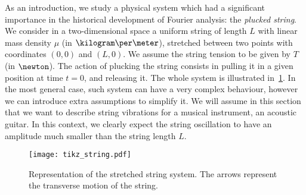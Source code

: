 As an introduction, we study a physical system which had a significant importance in the
historical development of Fourier analysis: the \emph{plucked string}. We consider in a
two-dimensional space a uniform string of length $L$ with linear mass density $\mu$ (in
$\kilogram\per\meter$), stretched between two points with coordinates $(0,0)$ and $(L,0)$.
We assume the string tension to be given by $T$ (in $\newton$). The action of plucking the
string consists in pulling it in a given position at time $t=0$, and releasing it. The
whole system is illustrated in~\cref{fig:string}. In the most general case, such system
can have a very complex behaviour, however we can introduce extra assumptions to simplify
it. We will assume in this section that we want to describe string vibrations for a
musical instrument, \eg an acoustic guitar. In this context, we clearly expect the string
oscillation to have an amplitude much smaller than the string length $L$.
\begin{figure}[t]
  \centering
  \texttt{[image: tikz\_string.pdf]}
  \caption{Representation of the stretched string system. The arrows represent the
  transverse motion of the string.}
  \label{fig:string}
\end{figure}
